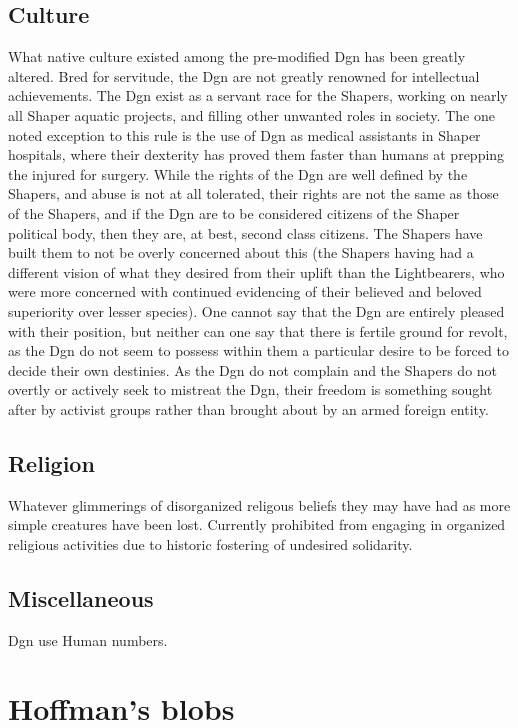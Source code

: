 \subsection{Culture}

What native culture existed among the pre-modified Dgn has been
greatly altered. Bred for servitude, the Dgn are not greatly renowned
for intellectual achievements. The Dgn exist as a servant race for the
Shapers, working on nearly all Shaper aquatic projects, and filling
other unwanted roles in society. The one noted exception to this rule
is the use of Dgn as medical assistants in Shaper hospitals, where
their dexterity has proved them faster than humans at prepping the
injured for surgery. While the rights of the Dgn are well defined by
the Shapers, and abuse is not at all tolerated, their rights are not
the same as those of the Shapers, and if the Dgn are to be considered
citizens of the Shaper political body, then they are, at best, second
class citizens. The Shapers have built them to not be overly concerned
about this (the Shapers having had a different vision of what they
desired from their uplift than the Lightbearers, who were more
concerned with continued evidencing of their believed and beloved
superiority over lesser species). One cannot say that the Dgn are
entirely pleased with their position, but neither can one say that
there is fertile ground for revolt, as the Dgn do not seem to possess
within them a particular desire to be forced to decide their own
destinies. As the Dgn do not complain and the Shapers do not overtly
or actively seek to mistreat the Dgn, their freedom is something
sought after by activist groups rather than brought about by an armed
foreign entity.

\subsection{Religion}

Whatever glimmerings of disorganized religous beliefs they may have
had as more simple creatures have been lost. Currently prohibited from
engaging in organized religious activities due to historic fostering
of undesired solidarity.

\subsection{Miscellaneous}
Dgn use Human numbers. 

\section{Hoffman's blobs}


